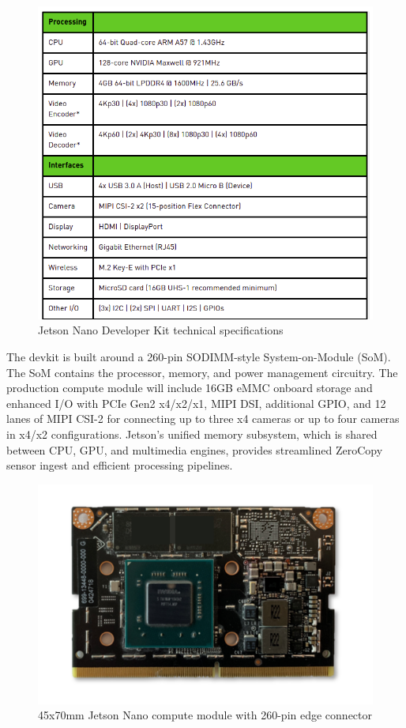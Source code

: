         \begin{figure}[H]
            \centering
            \includegraphics[width=0.6\linewidth]{img/nano-kit.png}
            \caption{Jetson Nano Developer Kit technical specifications}
        \end{figure}
        The devkit is built around a 260-pin SODIMM-style System-on-Module (SoM). The SoM contains the processor, memory, and power management circuitry. The production compute module will 
        include 16GB eMMC onboard storage and enhanced I/O with PCIe Gen2 x4/x2/x1, MIPI DSI, additional GPIO, and 12 lanes of MIPI CSI-2 for connecting up to three x4 cameras or up to four 
        cameras in x4/x2 configurations. Jetson’s unified memory subsystem, which is shared between CPU, GPU, and multimedia engines, provides streamlined ZeroCopy sensor ingest and efficient 
        processing pipelines.
        \begin{figure}[H]
            \centering
            \includegraphics[width=0.6\linewidth]{img/nano-compute.png}
            \caption{45x70mm Jetson Nano compute module with 260-pin edge connector}
        \end{figure}

